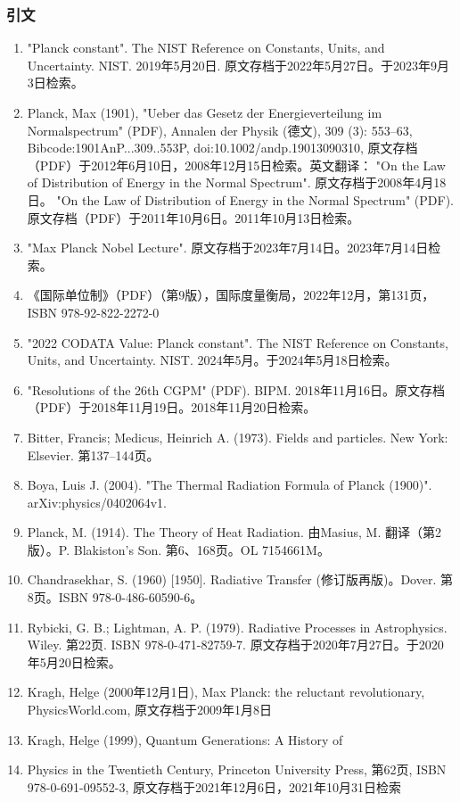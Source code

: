\subsubsection{引文}  

 
\begin{enumerate}
\item "Planck constant". The NIST Reference on Constants, Units, and Uncertainty. NIST. 2019年5月20日. 原文存档于2022年5月27日。于2023年9月3日检索。  
\item Planck, Max (1901), "Ueber das Gesetz der Energieverteilung im Normalspectrum" (PDF), Annalen der Physik (德文), 309 (3): 553–63, Bibcode:1901AnP...309..553P, doi:10.1002/andp.19013090310, 原文存档（PDF）于2012年6月10日，2008年12月15日检索。英文翻译：  
"On the Law of Distribution of Energy in the Normal Spectrum". 原文存档于2008年4月18日。  
"On the Law of Distribution of Energy in the Normal Spectrum" (PDF). 原文存档（PDF）于2011年10月6日。2011年10月13日检索。  
\item "Max Planck Nobel Lecture". 原文存档于2023年7月14日。2023年7月14日检索。  
\item 《国际单位制》（PDF）（第9版），国际度量衡局，2022年12月，第131页，ISBN 978-92-822-2272-0  
\item "2022 CODATA Value: Planck constant". The NIST Reference on Constants, Units, and Uncertainty. NIST. 2024年5月。于2024年5月18日检索。  
\item "Resolutions of the 26th CGPM" (PDF). BIPM. 2018年11月16日。原文存档（PDF）于2018年11月19日。2018年11月20日检索。  
\item Bitter, Francis; Medicus, Heinrich A. (1973). Fields and particles. New York: Elsevier. 第137–144页。  
\item Boya, Luis J. (2004). "The Thermal Radiation Formula of Planck (1900)". arXiv:physics/0402064v1.  
\item Planck, M. (1914). The Theory of Heat Radiation. 由Masius, M. 翻译（第2版）。P. Blakiston's Son. 第6、168页。OL 7154661M。  
\item Chandrasekhar, S. (1960) [1950]. Radiative Transfer (修订版再版)。Dover. 第8页。ISBN 978-0-486-60590-6。
\item Rybicki, G. B.; Lightman, A. P. (1979). Radiative Processes in Astrophysics. Wiley. 第22页. ISBN 978-0-471-82759-7. 原文存档于2020年7月27日。于2020年5月20日检索。  
\item Kragh, Helge (2000年12月1日), Max Planck: the reluctant revolutionary, PhysicsWorld.com, 原文存档于2009年1月8日  
\item Kragh, Helge (1999), Quantum Generations: A History of \item Physics in the Twentieth Century, Princeton University Press, 第62页, ISBN 978-0-691-09552-3, 原文存档于2021年12月6日，2021年10月31日检索  

\end{enumerate}
